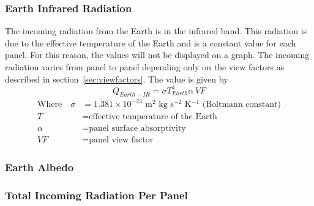\subsubsection{Earth Infrared Radiation}
The incoming radiation from the Earth is in the infrared band. This radiation is due to the effective temperature of the Earth and is a constant value for each panel. For this reason, the values will not be displayed on a graph. The incoming radiation varies from panel to panel depending only on the view factors as described in section~\ref{sec:viewfactors}. The value is given by
\begin{equation}
    Q_{Earth-IR} = \sigma T_{Earth}^4 \alpha \, VF 
\end{equation}
\vspace{-1cm}
\begin{align}
\text{Where}\quad \sigma &= 1.381 \times 10^{-23}\text{ m$^2$ kg s$^{-2}$ K$^{-1}$ (Boltmann constant)} \nonumber\\
T &= \text{effective temperature of the Earth} \nonumber\\
\alpha &= \text{panel surface absorptivity} \nonumber\\
VF &= \text{panel view factor} \nonumber
\end{align}

\subsubsection{Earth Albedo}

\subsubsection{Total Incoming Radiation Per Panel}

\begin{figure}[H]
\end{figure}


